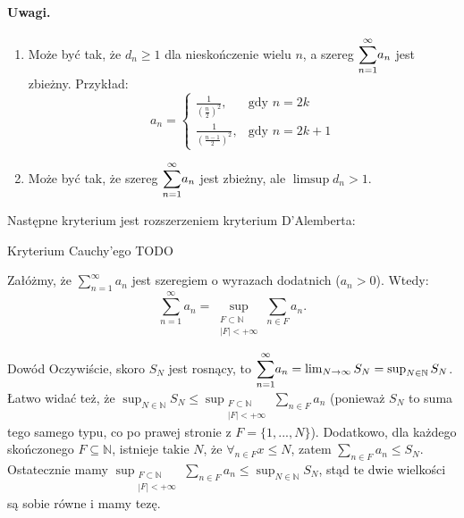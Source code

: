 \documentclass{article}
\numberwithin{defi}{section}
\numberwithin{defi}{section}
\newcommand{\N}{\mathbb{N}}
\newcommand{\oo}{\infty}
\newcommand{\se}{\subseteq}
\renewcommand{\geq}{\geqslant}
\renewcommand{\leq}{\leqslant}
\newcommand{\bsum}[2]{\mathlarger{\sum_{#1}^{#2}}}
\newcommand{\szerI}[1]{\bsum{n=1}{\oo} #1_n}
\newcommand{\gras}[2]{\lim_{#1 \to \oo} #2_{#1}}
\begin{document}
\paragraph{Uwagi.} \begin{enumerate}
    \item Może być tak, że $d_n \geq 1$ dla nieskończenie wielu $n$, a szereg $\szerI{a}$ jest zbieżny. Przykład: \begin{equation*}
        a_n = \begin{cases}
            \frac{1}{(\frac{n}{2})^2}, & \text{gdy } n  = 2k \\
            \frac{1}{(\frac{n-1}{2})^2}, &\text{gdy } n = 2k+ 1
        \end{cases}
    \end{equation*}
    \item Może być tak, że szereg $\szerI{a}$ jest zbieżny, ale $\limsup d_n > 1$. 
\end{enumerate}


Następne kryterium jest rozszerzeniem kryterium D'Alemberta: 
\begin{twier}{Kryterium Cauchy'ego}
TODO
    
\end{twier}


\begin{twier}{}
    Załóżmy, że $\sum_{n=1}^{\infty} a_n$ jest szeregiem o wyrazach dodatnich ($a_n > 0$). Wtedy:
    \begin{equation}
        \sum\limits_{n=1}^{\infty} a_n = \sup_{\substack{F \subset \N \\ |F| < +\infty}} \sum_{n \in F} a_n.
    \end{equation}
\end{twier}

\begin{dow}{Dowód}
    Oczywiście, skoro $S_N$ jest rosnący, to $\szerI{a} = \gras{N}{S} = \sup_{N \in \N} S_N$. Łatwo widać też, że $\sup_{N \in \N} S_N \leq \sup_{\substack{F \subset \N \\ |F| < +\infty}} \sum_{n \in F} a_n$ (ponieważ $S_N$ to suma tego samego typu, co po prawej stronie z $F = \{1, ..., N\}$). Dodatkowo, dla każdego skończonego $F \se \N$, istnieje takie $N$, że $\forall_{n \in F} x \leq N$, zatem $\sum_{n \in F} a_n \leq S_N$. Ostatecznie mamy $ \sup_{\substack{F \subset \N \\ |F| < +\infty}} \sum_{n \in F} a_n \leq \sup_{N \in \N} S_N$, stąd te dwie wielkości są sobie równe i mamy tezę.
\end{dow}
\end{document}
